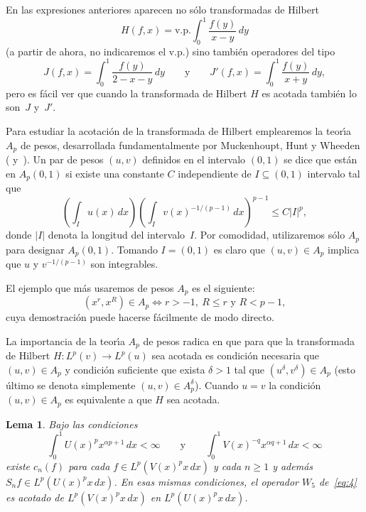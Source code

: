 \documentclass[a4paper]{article}
\newtheorem*{lemma*}{Lema}
\newcommand{\longto}{\longrightarrow}
\begin{document}
En las expresiones anteriores aparecen no s\'olo transformadas 
de Hilbert
\begin{equation*}
  H(f,x) = \text{v.p.} \int_{0}^{1} \frac{f(y)}{x-y} \,dy
\end{equation*}
(a partir de ahora, no indicaremos el v.p.) sino tambi\'en operadores 
del tipo
\begin{equation*}
  J(f,x) = \int_{0}^{1} \frac{f(y)}{2-x-y} \,dy
  \qquad\mbox{y}\qquad
  J'(f,x) = \int_{0}^{1} \frac{f(y)}{x+y} \,dy,
\end{equation*}
pero es f\'acil ver que cuando la transformada de Hilbert $H$ es 
acotada tambi\'en lo son~$J$ y~$J'$.

Para estudiar la acotaci\'on de la transformada de Hilbert emplearemos 
la teor\'{\i}a $A_p$ de pesos, desarrollada fundamentalmente por 
Muckenhoupt, Hunt y Wheeden (\cite{HuMuWh} y~\cite{MuWh}).
Un par de pesos $(u,v)$  definidos en el intervalo $(0,1)$
se dice que est\'an en $A_p(0,1)$ si existe una constante $C$
independiente de $I \subseteq (0,1)$ 
intervalo tal que
\begin{equation*}
  \left( \int_{I} u(x)\,dx \right)
  \left( \int_{I} v(x)^{-1/(p-1)}\,dx \right)^{p-1} 
  \leq C |I|^p,
\end{equation*}
donde $|I|$ denota la longitud del intervalo~$I$. Por comodidad, 
utilizaremos s\'olo $A_p$ para designar $A_p(0,1)$.
Tomando $I = (0,1)$ es claro que $(u,v) \in A_p$ implica que
$u$ y $v^{-1/(p-1)}$ son integrables.

El ejemplo que m\'as usaremos de pesos $A_p$ es el siguiente:
\begin{equation}
\label{eq:5}
  (x^{r},x^{R}) \in A_p \iff r > -1,
  \ R \leq r \text{ y } R < p-1,
\end{equation}
cuya demostraci\'on puede hacerse f\'acilmente de modo directo.

La importancia de la teor\'{\i}a $A_p$ de pesos radica en que para 
que la transformada de Hilbert
$H : L^p(v) \longto L^p(u)$ sea acotada es condici\'on 
necesaria que $(u,v) \in A_p$ y condici\'on suficiente que 
exista $\delta > 1$ tal que $(u^{\delta},v^{\delta}) \in A_p$
(esto \'ultimo se denota simplemente $(u,v) \in A_p^{\delta}$).
Cuando $u = v$ la condici\'on $(u,v) \in A_p$ es equivalente
a que $H$ sea acotada.

\begin{lemma*}
Bajo las condiciones
\begin{equation*}
  \int_{0}^{1} U(x)^p x^{\alpha p+1} \,dx < \infty
  \qquad\mbox{y}\qquad
  \int_{0}^{1} V(x)^{-q} x^{\alpha q+1} \,dx < \infty
\end{equation*}
existe $c_{n}(f)$ para cada $f \in L^p(V(x)^p x\,dx)$ y cada $n \geq 1$
y adem\'as $S_{n}f \in L^p(U(x)^p x\,dx)$. En esas 
mismas condiciones, el operador $W_{5}$ de~\eqref{eq:4}
es acotado de $L^p(V(x)^p x\,dx)$ en $L^p(U(x)^p x\,dx)$.
\end{lemma*}
\end{document}

